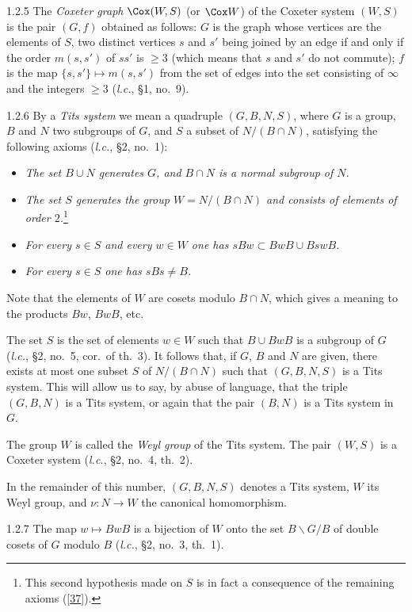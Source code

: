 \documentclass[12pt,a4paper,oneside,english]{smfart}
\makeatletter
\newcommand{\btanchor}[1]{\leavevmode\Hy@raisedlink{\hypertarget{bt:#1}{}}}
\newcommand{\btbib}[1]{\hyperlink{bib:#1}{#1}}
\theoremstyle{definition}
\theoremstyle{bt}
\makeatother
\begin{document}
\num{1.2.5}\btanchor{1.2.5} The \emph{Coxeter graph} $\Cox(W,S)$ (or $\Cox W$) of the Coxeter
system $(W,S)$ is the pair $(G,f)$ obtained as follows: $G$ is the graph whose vertices are the elements of $S$, two distinct vertices $s$ and $s'$ being joined by an edge if and only if the order $m(s,s')$ of $ss'$ is $\geqslant3$ (which means that $s$ and $s'$ do not commute); $f$ is the map $\{s,s'\}\mapsto m(s,s')$ from the set of edges into the set consisting of $\infty$ and the integers $\geqslant3$ (\emph{l.c.}, \S1, no.~9).

\num{1.2.6}\btanchor{1.2.6} By a \emph{Tits system} we mean a quadruple $(G,B,N,S)$, where $G$
is a group, $B$ and $N$ two subgroups of $G$, and $S$ a subset of $N/(B\cap N)$, satisfying the following axioms (\emph{l.c.}, \S2, no.~1):
\begin{itemize}[leftmargin=3.2em]
\item[(T1)] \emph{The set $B\cup N$ generates $G$, and $B\cap N$ is a normal
  subgroup of $N$.}
\item[(T2)] \emph{The set $S$ generates the group $W=N/(B\cap N)$ and consists
  of elements of order $2$.}\footnote{This second hypothesis made on $S$ is in   fact a consequence of the remaining axioms ([\btbib{37}]).}
\item[(T3)] \emph{For every $s\in S$ and every $w\in W$ one has
  $sBw\subset BwB\cup BswB$.}
\item[(T4)] \emph{For every $s\in S$ one has $sBs\neq B$.}
\end{itemize}
Note that the elements of $W$ are cosets modulo $B\cap N$, which gives a meaning to the products $Bw$, $BwB$, etc.

The set $S$ is the set of elements $w\in W$ such that $B\cup BwB$ is a subgroup of $G$ (\emph{l.c.}, \S2, no.~5, cor.\ of th.~3). It follows that, if $G$, $B$ and $N$ are given, there exists at most one subset $S$ of $N/(B\cap N)$ such that $(G,B,N,S)$ is a Tits system. This will allow us to say, by abuse of language, that the triple $(G,B,N)$ is a Tits system, or again that the pair $(B,N)$ is a Tits system in $G$.

The group $W$ is called the \emph{Weyl group} of the Tits system. The pair $(W,S)$ is a Coxeter system (\emph{l.c.}, \S2, no.~4, th.~2).

In the remainder of this number, $(G,B,N,S)$ denotes a Tits system, $W$ its Weyl group, and $\nu:N\rightarrow W$ the canonical homomorphism.

\num{1.2.7}\btanchor{1.2.7} The map $w\mapsto BwB$ is a bijection of $W$ onto the set
$B\backslash G/B$ of double cosets of $G$ modulo $B$ (\emph{l.c.}, \S2, no.~3, th.~1).
\end{document}
